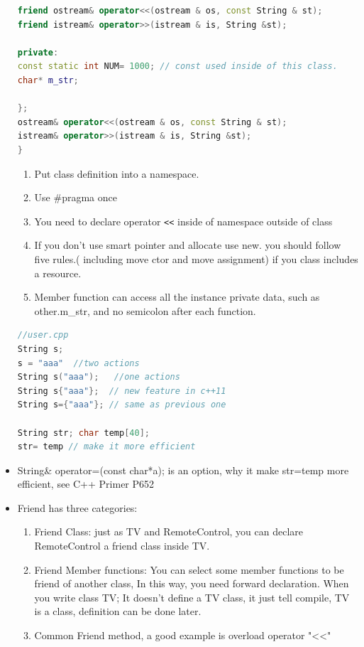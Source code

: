 \documentclass[a4paper,12pt,twoside]{book}
\begin{document}
\begin{itemize}
\begin{lstlisting}[frame=single, language=c++]
friend ostream& operator<<(ostream & os, const String & st);
friend istream& operator>>(istream & is, String &st);

private:
const static int NUM= 1000; // const used inside of this class.
char* m_str;
	
};
ostream& operator<<(ostream & os, const String & st);
istream& operator>>(istream & is, String &st);
}
\end{lstlisting}

\begin{enumerate}
\item Put class definition into a namespace.
\item Use \#pragma once
\item You need to declare operator \verb=<<= inside of namespace outside of class
\item If you don't use smart pointer and allocate use new. you should follow five rules.( including move ctor and move assignment) if you class includes a resource.
\item Member function can access all the instance private data, such as other.m\_str, and no semicolon after each function.
\end{enumerate}


\begin{lstlisting}[frame=single, language=c++]
//user.cpp
String s;
s = "aaa"  //two actions
String s("aaa");   //one actions
String s{"aaa"};  // new feature in c++11
String s={"aaa"}; // same as previous one

String str; char temp[40];
str= temp // make it more efficient
\end{lstlisting}

\item String\& operator=(const char*a); is an option, why it make str=temp more efficient, see C++ Primer P652

\item  Friend has three categories:
\begin{enumerate}
\item Friend Class: just as TV and RemoteControl, you can declare RemoteControl a friend class inside TV.
\item Friend Member functions: You can select some member functions to be friend of another class, In this way, you need forward declaration.  When you write class TV;  It doesn't define a TV class, it just tell compile, TV is a class, definition can be done later.
\item Common Friend method, a good example is overload operator "<<"
\end{enumerate}


\end{itemize}
\end{document}

